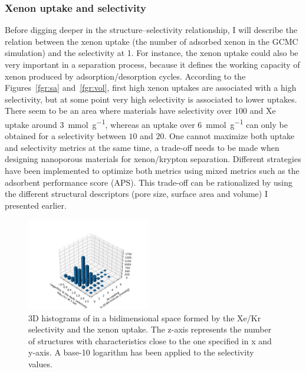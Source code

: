 \documentclass[main.tex]{subfiles}
\begin{document}
\subsubsection{Xenon uptake and selectivity}

Before digging deeper in the structure--selectivity relationship, I will describe the relation between the xenon uptake (the number of adsorbed xenon in the GCMC simulation) and the selectivity at \SI{1}{\atm}. For instance, the xenon uptake could also be very important in a separation process, because it defines the working capacity of xenon produced by adsorption/desorption cycles. According to the Figures~\ref{fgr:sa} and~\ref{fgr:vol}, first high xenon uptakes are associated with a high selectivity, but at some point very high selectivity is associated to lower uptakes. There seem to be an area where materials have selectivity over $100$ and Xe uptake around \SI{3}{\milli\mole\per\gram}, whereas an uptake over \SI{6}{\milli\mole\per\gram} can only be obtained for a selectivity between $10$ and $20$. One cannot maximize both uptake and selectivity metrics at the same time, a trade-off needs to be made when designing nanoporous materials for xenon/krypton separation.\autocite{Zhang_2022} Different strategies have been implemented to optimize both metrics using mixed metrics such as the adsorbent performance score (APS).\autocite{Solanki_2020}
This trade-off can be rationalized by using the different structural descriptors (pore size, surface area and volume) I presented earlier. 

\begin{figure}[ht]
  \centering
  \includegraphics[width=0.48\textwidth]{figures/2-thermo/3D_hist_selec_uptake.pdf}
  \caption{3D histograms of in a bidimensional space formed by the Xe/Kr selectivity and the xenon uptake. The z-axis represents the number of structures with characteristics close to the one specified in x and y-axis. A base-10 logarithm has been applied to the selectivity values.}\label{fgr:3D_uptake}
\end{figure}
\end{document}
